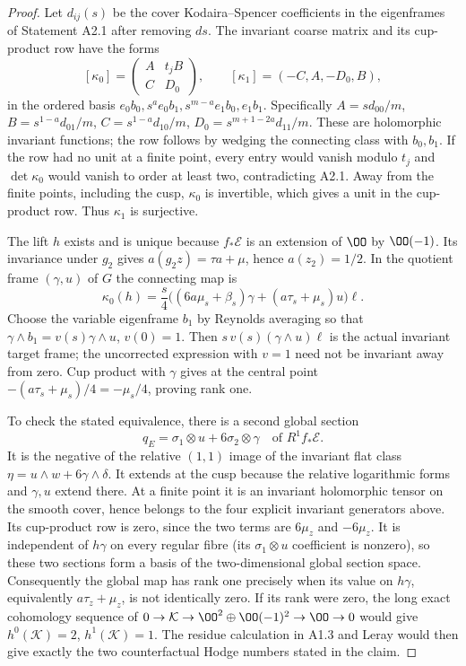 \begin{proof}
Let $d_{ij}(s)$ be the cover Kodaira--Spencer coefficients in the
eigenframes of Statement A2.1 after removing $ds$.
The invariant coarse matrix and its cup-product row have the forms
\[
[\kappa_0]=\begin{pmatrix}A&t_jB\\C&D_0\end{pmatrix},\qquad
[\kappa_1]=(-C,A,-D_0,B),
\]
in the ordered basis
$e_0b_0,s^ae_0b_1,s^{m-a}e_1b_0,e_1b_1$.  Specifically
$A=sd_{00}/m$, $B=s^{1-a}d_{01}/m$,
$C=s^{1-a}d_{10}/m$, $D_0=s^{m+1-2a}d_{11}/m$.
These are holomorphic invariant functions; the row follows by
wedging the connecting class with $b_0,b_1$.
If the row had no unit at a finite point, every entry would vanish
modulo $t_j$ and $\det\kappa_0$ would vanish to order at least two,
contradicting A2.1.  Away from the finite points, including the cusp,
$\kappa_0$ is invertible, which gives a unit in the cup-product row.
Thus $\kappa_1$ is surjective.

The lift $h$ exists and is unique because $f_*\mathcal E$ is an
extension of $\OO$ by $\OO(-1)$.  Its invariance under $g_2$ gives
$a(g_2z)=\tau a+\mu$, hence $a(z_2)=1/2$.
In the quotient frame $(\gamma,u)$ of $G$ the connecting map is
\[
\kappa_0(h)=\frac{s}{4}
\bigl((6a\mu_s+\beta_s)\gamma+(a\tau_s+\mu_s)u\bigr)\ell.
\]
Choose the variable eigenframe $b_1$ by Reynolds averaging so that
$\gamma\wedge b_1=v(s)\gamma\wedge u$, $v(0)=1$.
Then $s\,v(s)(\gamma\wedge u)\ell$ is the actual invariant
target frame; the uncorrected expression with $v=1$ need not be
invariant away from zero.  Cup product with $\gamma$ gives at the
central point $-(a\tau_s+\mu_s)/4=-\mu_s/4$, proving rank one.

To check the stated equivalence, there is a second global section
\[
q_E=\sigma_1\otimes u+6\sigma_2\otimes\gamma
\quad\text{of }R^1f_*\mathcal E.
\]
It is the negative of the relative $(1,1)$ image of the invariant
flat class $\eta=u\wedge w+6\gamma\wedge\delta$.
It extends at the cusp because the relative logarithmic forms and
$\gamma,u$ extend there.  At a finite point it is an invariant
holomorphic tensor on the smooth cover, hence belongs to the four
explicit invariant generators above.  Its cup-product row is zero,
since the two terms are $6\mu_z$ and $-6\mu_z$.
It is independent of $h\gamma$ on every regular fibre (its
$\sigma_1\otimes u$ coefficient is nonzero), so these two sections
form a basis of the two-dimensional global section space.
Consequently the global map has rank one precisely when its value
on $h\gamma$, equivalently $a\tau_z+\mu_z$, is not identically
zero.  If its rank were zero, the long exact cohomology sequence of
$0\to\mathcal K\to\OO^2\oplus\OO(-1)^2\to\OO\to0$
would give $h^0(\mathcal K)=2$, $h^1(\mathcal K)=1$.
The residue calculation in A1.3 and Leray would then give exactly
the two counterfactual Hodge numbers stated in the claim.
\end{proof}

